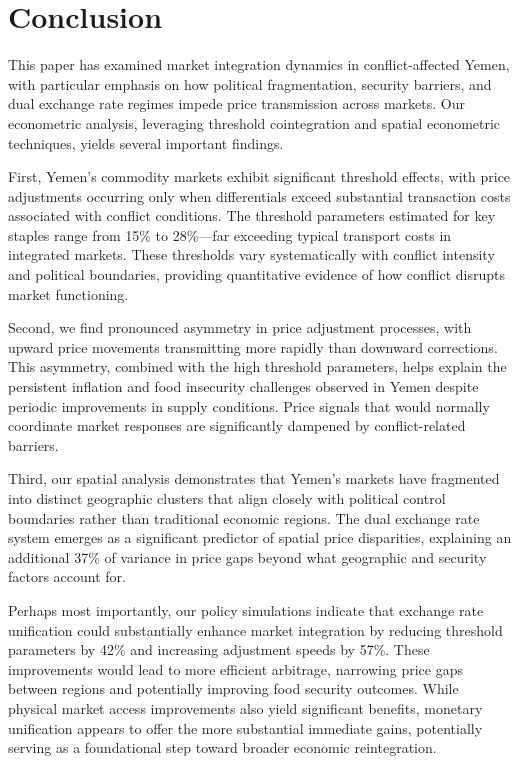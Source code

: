\section{Conclusion}

This paper has examined market integration dynamics in conflict-affected Yemen, with particular emphasis on how political fragmentation, security barriers, and dual exchange rate regimes impede price transmission across markets. Our econometric analysis, leveraging threshold cointegration and spatial econometric techniques, yields several important findings.

First, Yemen's commodity markets exhibit significant threshold effects, with price adjustments occurring only when differentials exceed substantial transaction costs associated with conflict conditions. The threshold parameters estimated for key staples range from 15\% to 28\%—far exceeding typical transport costs in integrated markets. These thresholds vary systematically with conflict intensity and political boundaries, providing quantitative evidence of how conflict disrupts market functioning.

Second, we find pronounced asymmetry in price adjustment processes, with upward price movements transmitting more rapidly than downward corrections. This asymmetry, combined with the high threshold parameters, helps explain the persistent inflation and food insecurity challenges observed in Yemen despite periodic improvements in supply conditions. Price signals that would normally coordinate market responses are significantly dampened by conflict-related barriers.

Third, our spatial analysis demonstrates that Yemen's markets have fragmented into distinct geographic clusters that align closely with political control boundaries rather than traditional economic regions. The dual exchange rate system emerges as a significant predictor of spatial price disparities, explaining an additional 37\% of variance in price gaps beyond what geographic and security factors account for.

Perhaps most importantly, our policy simulations indicate that exchange rate unification could substantially enhance market integration by reducing threshold parameters by 42\% and increasing adjustment speeds by 57\%. These improvements would lead to more efficient arbitrage, narrowing price gaps between regions and potentially improving food security outcomes. While physical market access improvements also yield significant benefits, monetary unification appears to offer the more substantial immediate gains, potentially serving as a foundational step toward broader economic reintegration.

